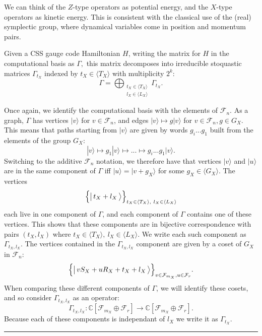 \documentclass[11pt,oneside]{article}
\def\Complex{\mathbb{C}}
\newcommand{\ket}[1]{|{#1}\rangle}
\newcommand{\bket}[1]{\bigl|\,{#1}\,\bigr\rangle}
\def\Span#1{\langle #1 \rangle}
\newcommand{\Field}{\mathcal{F}}
\def\Fnd{\Field_{n}}
\def\Frd{\Field_{r}}
\renewenvironment{framed}
{\begin{samepage}
\MakeFramed{\hsize0.8\linewidth\advance\hsize-\width\FrameRestore}}
{\endMakeFramed\end{samepage}}
\newcommand\dolemma[1]{\vskip 5pt \noindent{\bf \underline{Lemma #1.}\ }}
\newcommand\doproof{\vskip 5pt \noindent{\bf \underline{Proof:}\ }}
\newcommand\tombstone{\rule{.36em}{2ex}\vskip 5pt}
\newcounter{ritem}
\newcommand{\ritem}[1]{\refstepcounter{ritem}\theritem\label{#1}}
\begin{document}
We can think of the $Z$-type operators as potential energy,
and the $X$-type operators as kinetic energy.
This is consistent with the classical use of the (real) symplectic group,
where dynamical variables come in position and momentum pairs.

\dolemma{\ritem{lemma21}}
Given a CSS gauge code Hamiltonian $H$, writing
the matrix for $H$ in the computational basis as $\Gamma,$
this matrix decomposes into irreducible
stoquastic matrices $\Gamma_{t_X}$ 
indexed by $t_X\in\Span{T_X}$
with multiplicity $2^k$:
$$
    \Gamma = \bigoplus_{
    \substack{t_X\in\Span{T_X}\\l_X\in\Span{L_X}}}
        \Gamma_{t_X}.
$$

\doproof
Once again, we identify the computational basis with
the elements of $\Field_n.$
As a graph, $\Gamma$ has vertices 
$\ket{v} $ for $v\in\Field_n$, and edges 
$ \ket{v} \mapsto g \ket{v}$ for  $v\in\Fnd, g\in G_X.$
This means that paths starting from $\ket{v}$ are given by
words $g_i...g_1$ built from the elements of the group $G_X:$
$$
    \ket{v} \mapsto g_1 \ket{v} \mapsto ... \mapsto g_i...g_1 \ket{v}.
$$
Switching to the additive $\Field_n$ notation, we
therefore have that 
vertices $\ket{v}$ and $\ket{u}$ are in the
same component of $\Gamma$ iff $\ket{u} = \ket{v+g_X}$ for some $g_X\in\Span{G_X}.$
The vertices
$$\Bigl\{ \bket{t_X + l_X} \Bigr\}_{t_X\in\Span{T_X},\ l_X\in\Span{L_X}}$$
each live in one component of $\Gamma$,
and each component of $\Gamma$ contains one of these vertices.
This shows that these components are in bijective correspondence with
pairs $(t_X, l_X)$ where $t_X\in\Span{T_X},\ l_X\in\Span{L_X}$.
We write each such component as $\Gamma_{t_X,l_X}$.
The vertices contained in the $\Gamma_{t_X,l_X}$ component
are given by a coset of $G_X$ in $\Fnd:$
$$
    \Bigl\{ \bket{v S_X + u R_X + t_X + l_X} \Bigr\}_{v\in \Field_{m_X}, u\in\Frd}.
$$
When comparing these different components of $\Gamma$, we will
identify these cosets, and so consider $\Gamma_{t_X,l_X}$ as an
operator:
$$
    \Gamma_{t_X,l_X} : \Complex[\Field_{m_X}\oplus\Field_r] \to \Complex[\Field_{m_X}\oplus\Field_r].
$$
Because each of these components is independant of $l_X$ we write it as $\Gamma_{t_X}.$
\tombstone

\end{document}
